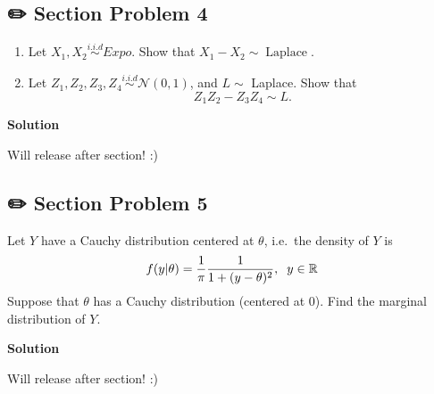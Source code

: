 \documentclass[
  letterpaper,
  DIV=11,
  numbers=noendperiod]{scrreprt}
\theoremstyle{definition}
\theoremstyle{plain}
\theoremstyle{remark}
\begin{document}
\hypertarget{section-problem-4-1}{%
\subsection*{✏️ Section Problem 4}\label{section-problem-4-1}}

\begin{enumerate}
\def\labelenumi{(\alph{enumi})}
\item
  Let \(X_1, X_2 \overset{i.i.d}{\sim} Expo\). Show that
  \(X_1 - X_2 \sim \operatorname{Laplace}\).
\item
  Let \(Z_1,Z_2,Z_3,Z_4 \overset{i.i.d}{\sim} \mathcal{N}(0,1)\), and
  \(L \sim\) Laplace. Show that \[
  Z_1 Z_2 - Z_3 Z_4 \sim L.
  \]
\end{enumerate}

\begin{tcolorbox}[enhanced jigsaw, leftrule=.75mm, colframe=quarto-callout-tip-color-frame, colback=white, breakable, opacityback=0, left=2mm, bottomrule=.15mm, arc=.35mm, rightrule=.15mm, toprule=.15mm]
\begin{minipage}[t]{5.5mm}
\textcolor{quarto-callout-tip-color}{\faLightbulb}
\end{minipage}%
\begin{minipage}[t]{\textwidth - 5.5mm}

\textbf{Solution}\vspace{2mm}

Will release after section! :)

\end{minipage}%
\end{tcolorbox}

\hypertarget{section-problem-5-1}{%
\subsection*{✏️ Section Problem 5}\label{section-problem-5-1}}

Let \(Y\) have a Cauchy distribution centered at \(\theta\), i.e.~the
density of \(Y\) is
\[f(y|\theta) = \frac{1}{\pi} \frac{1}{1+(y-\theta)^2} ,\hspace{0.2cm} y \in \mathbb{R} \]
Suppose that \(\theta\) has a Cauchy distribution (centered at \(0\)).
Find the marginal distribution of \(Y\).

\begin{tcolorbox}[enhanced jigsaw, leftrule=.75mm, colframe=quarto-callout-tip-color-frame, colback=white, breakable, opacityback=0, left=2mm, bottomrule=.15mm, arc=.35mm, rightrule=.15mm, toprule=.15mm]
\begin{minipage}[t]{5.5mm}
\textcolor{quarto-callout-tip-color}{\faLightbulb}
\end{minipage}%
\begin{minipage}[t]{\textwidth - 5.5mm}

\textbf{Solution}\vspace{2mm}

Will release after section! :)

\end{minipage}%
\end{tcolorbox}
\end{document}
